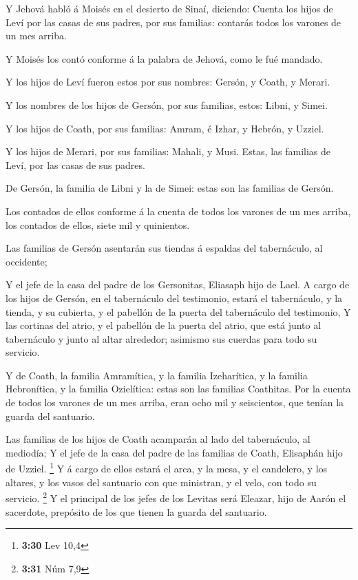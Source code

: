  Y Jehová habló á Moisés en el desierto de Sinaí,
diciendo:  Cuenta los hijos de Leví por las casas de sus
padres, por sus familias: contarás todos los varones de un mes arriba.

 Y Moisés los contó conforme á la palabra de Jehová, como
le fué mandado.

 Y los hijos de Leví fueron estos por sus nombres:
Gersón, y Coath, y Merari.

 Y los nombres de los hijos de Gersón, por sus familias,
estos: Libni, y Simei.

 Y los hijos de Coath, por sus familias: Amram, é Izhar,
y Hebrón, y Uzziel.

 Y los hijos de Merari, por sus familias: Mahali, y Musi.
Estas, las familias de Leví, por las casas de sus padres.

 De Gersón, la familia de Libni y la de Simei: estas son
las familias de Gersón.

 Los contados de ellos conforme á la cuenta de todos los
varones de un mes arriba, los contados de ellos, siete mil y quinientos.

 Las familias de Gersón asentarán sus tiendas á espaldas
del tabernáculo, al occidente;

 Y el jefe de la casa del padre de los Gersonitas,
Eliasaph hijo de Lael.  A cargo de los hijos de Gersón,
en el tabernáculo del testimonio, estará el tabernáculo, y la tienda, y
su cubierta, y el pabellón de la puerta del tabernáculo del testimonio,
 Y las cortinas del atrio, y el pabellón de la puerta del
atrio, que está junto al tabernáculo y junto al altar alrededor;
asimismo sus cuerdas para todo su servicio.

 Y de Coath, la familia Amramítica, y la familia
Izeharítica, y la familia Hebronítica, y la familia Ozielítica: estas
son las familias Coathitas.  Por la cuenta de todos los
varones de un mes arriba, eran ocho mil y seiscientos, que tenían la
guarda del santuario.

 Las familias de los hijos de Coath acamparán al lado del
tabernáculo, al mediodía;  Y el jefe de la casa del padre
de las familias de Coath, Elisaphán hijo de Uzziel. \footnote{\textbf{3:30}
  Lev 10,4}  Y á cargo de ellos estará el arca, y la
mesa, y el candelero, y los altares, y los vasos del santuario con que
ministran, y el velo, con todo su servicio. \footnote{\textbf{3:31} Núm
  7,9}  Y el principal de los jefes de los Levitas será
Eleazar, hijo de Aarón el sacerdote, prepósito de los que tienen la
guarda del santuario.

